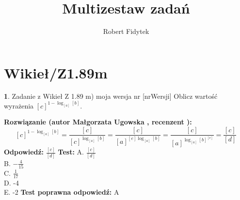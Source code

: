 \documentclass[12pt, a4paper]{article}
\title{Multizestaw zadań}
\author{Robert Fidytek}
\date{}
\theoremstyle{definition} %
\newtheorem{zad}{}
\newcommand{\kategoria}[1]{\section{#1}} %
\newcommand{\zadStart}[1]{\begin{zad}#1\newline} %
\newcommand{\zadStop}{\end{zad}}   %
\newcommand{\rozwStart}[2]{\noindent \textbf{Rozwiązanie (autor #1 , recenzent #2): }\newline} %
\newcommand{\rozwStop}{\newline}                                            %
\newcommand{\odpStart}{\noindent \textbf{Odpowiedź:}\newline}    %
\newcommand{\odpStop}{\newline}                                             %
\newcommand{\testStart}{\noindent \textbf{Test:}\newline} %
\newcommand{\testStop}{\newline} %
\newcommand{\kluczStart}{\noindent \textbf{Test poprawna odpowiedź:}\newline} %
\newcommand{\kluczStop}{\newline} %
\begin{document}
\maketitle


\kategoria{Wikieł/Z1.89m}
\zadStart{Zadanie z Wikieł Z 1.89 m) moja wersja nr [nrWersji]}
Oblicz warto\'sć wyrażenia $[c]^{1-\log_{[a]}{[b]}}$.
\zadStop
\rozwStart{Małgorzata Ugowska}{}
$$[c]^{1-\log_{[a]}{[b]}}= \frac{[c]}{[c]^{\log_{[a]}{[b]}}} = \frac{[c]}{[a]^{[e] \log_{[a]}{[b]}}} =  \frac{[c]}{[a]^{\log_{[a]}{[b]^[e]}}} = \frac{[c]}{[d]} $$
\rozwStop
\odpStart
$\frac{[c]}{[d]}$
\odpStop
\testStart
A. $\frac{[c]}{[d]}$\\
B. $-\frac{4}{15}$\\
C. $\frac{1}{17}$\\
D. -4\\
E. -2
\testStop
\kluczStart
A
\kluczStop
\end{document}
